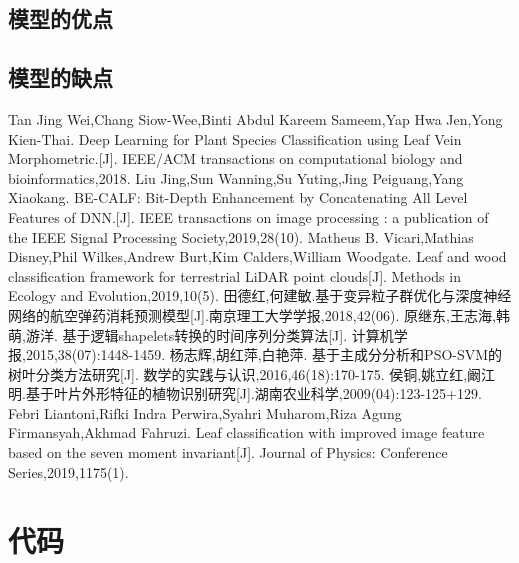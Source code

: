 \documentclass{whutmod}
\begin{document}
	\subsection{模型的优点}

	
	\subsection{模型的缺点}

    
	\newpage	%
	\nocite{*}		%
%
%	
\begin{thebibliography}{9}%
	 Tan Jing Wei,Chang Siow-Wee,Binti Abdul Kareem Sameem,Yap Hwa Jen,Yong Kien-Thai. Deep Learning for Plant Species Classification using Leaf Vein Morphometric.[J]. IEEE/ACM transactions on computational biology and bioinformatics,2018.
	Liu Jing,Sun Wanning,Su Yuting,Jing Peiguang,Yang Xiaokang. BE-CALF: Bit-Depth Enhancement by Concatenating All Level Features of DNN.[J]. IEEE transactions on image processing : a publication of the IEEE Signal Processing Society,2019,28(10).
	Matheus B. Vicari,Mathias Disney,Phil Wilkes,Andrew Burt,Kim Calders,William Woodgate. Leaf and wood classification framework for terrestrial LiDAR point clouds[J]. Methods in Ecology and Evolution,2019,10(5).
	田德红,何建敏.基于变异粒子群优化与深度神经网络的航空弹药消耗预测模型[J].南京理工大学学报,2018,42(06).
	原继东,王志海,韩萌,游洋. 基于逻辑shapelets转换的时间序列分类算法[J]. 计算机学报,2015,38(07):1448-1459.
	杨志辉,胡红萍,白艳萍. 基于主成分分析和PSO-SVM的树叶分类方法研究[J]. 数学的实践与认识,2016,46(18):170-175.
	侯铜,姚立红,阚江明.基于叶片外形特征的植物识别研究[J].湖南农业科学,2009(04):123-125+129.
	Febri Liantoni,Rifki Indra Perwira,Syahri Muharom,Riza Agung Firmansyah,Akhmad Fahruzi. Leaf classification with improved image feature based on the seven moment invariant[J]. Journal of Physics: Conference Series,2019,1175(1).
\end{thebibliography}

	\newpage
	\appendix %
\section{代码}
\end{document}
